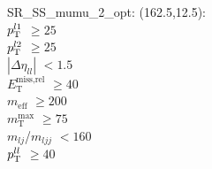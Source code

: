 SR\_SS\_mumu\_2\_opt: (162.5,12.5): \\
$p_{\text{T}}^{l1}$ $\geq 25$ \\
$p_{\text{T}}^{l2}$ $\geq 25$ \\
$|\Delta\eta_{ll}|$ $<1.5$ \\
$E_{\text{T}}^{\text{miss,rel}}$ $\geq 40$ \\
$m_{\text{eff}}$ $\geq 200$ \\
$m_{\text{T}}^{\text{max}}$ $\geq 75$ \\
$m_{lj}$/$m_{ljj}$ $<160$ \\
$p_{\text{T}}^{ll}$ $\geq 40$ \\

